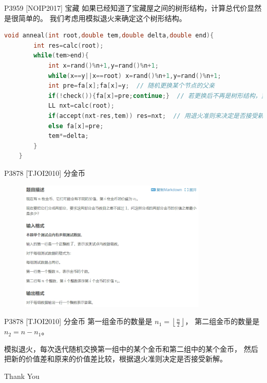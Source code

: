 \documentclass{beamer}
\begin{document}
\begin{frame}[fragile]{P3959 [NOIP2017] 宝藏}
    \small
    如果已经知道了宝藏屋之间的树形结构，计算总代价显然是很简单的。
    我们考虑用模拟退火来确定这个树形结构。

    \vspace{1em}\pause
    \begin{lstlisting}[language=c++]
    void anneal(int root,double tem,double delta,double end){
        int res=calc(root);
        while(tem>end){
            int x=rand()%n+1,y=rand()%n+1;
            while(x==y||x==root) x=rand()%n+1,y=rand()%n+1;
            int pre=fa[x];fa[x]=y;  // 随机更换某个节点的父亲
            if(!check()){fa[x]=pre;continue;}  // 若更换后不再是树形结构，重新随机
            LL nxt=calc(root);
            if(accept(nxt-res,tem)) res=nxt;  // 用退火准则来决定是否接受新解
            else fa[x]=pre;
            tem*=delta;
        }
    }
    \end{lstlisting}

\end{frame}

\begin{frame}{P3878 [TJOI2010] 分金币}
    \small
    \begin{figure}[H]
        \centering
        \includegraphics[width=0.8\textwidth]{pic/p3878.png}
    \end{figure}
\end{frame}

\begin{frame}{P3878 [TJOI2010] 分金币}
    \small
    第一组金币的数量是 $n_1=\left\lfloor\frac{n}{2}\right\rfloor$，
    第二组金币的数量是 $n_2=n-n_1$。

    \vspace{1em}\pause
    模拟退火，每次迭代随机交换第一组中的某个金币和第二组中的某个金币，
    然后把新的价值差和原来的价值差比较，根据退火准则决定是否接受新解。
\end{frame}


\begin{frame}
    \begin{center}
        {\Huge\calligra Thank You}
    \end{center}
\end{frame}
\end{document}
